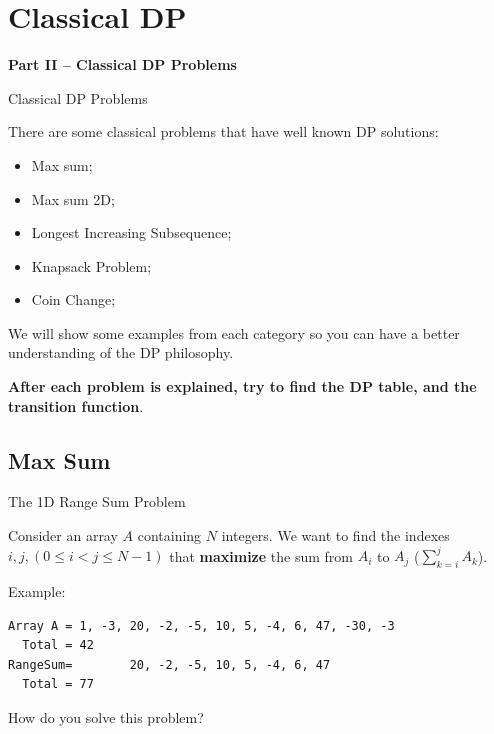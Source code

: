 

\section{Classical DP}

\begin{frame}
  \begin{center}
    {\bf Part II -- Classical DP Problems}
  \end{center}
\end{frame}

\begin{frame}{Classical DP Problems}

  There are some classical problems that have well known DP solutions:
  \bigskip

  \begin{itemize}
    \item Max sum;
    \item Max sum 2D;
    \item Longest Increasing Subsequence;
    \item Knapsack Problem;
    \item Coin Change;
  \end{itemize}
  \bigskip

  We will show some examples from each category so you can have a better understanding of the DP philosophy.\bigskip

  {\bf After each problem is explained, try to find the DP table, and the transition function}.
\end{frame}

\subsection{Max Sum}

\begin{frame}[fragile]{The 1D Range Sum Problem}

  Consider an array $A$ containing $N$ integers. We want to find the indexes $i,j, (0 \leq i < j \leq N-1)$ that {\bf maximize} the sum from $A_i$ to $A_j$ ($\sum_{k=i}^{j} A_k$).
  \bigskip

  Example:
\begin{verbatim}
Array A = 1, -3, 20, -2, -5, 10, 5, -4, 6, 47, -30, -3
  Total = 42
RangeSum=        20, -2, -5, 10, 5, -4, 6, 47
  Total = 77
\end{verbatim}
\bigskip

How do you solve this problem?
\end{frame}

